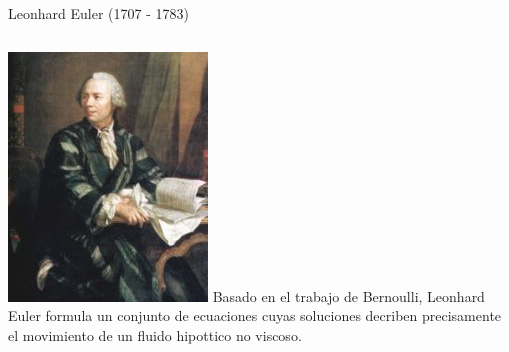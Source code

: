 \documentclass[serif,9pt]{beamer}
\begin{document}
\begin{frame}
\begin{block}{Leonhard Euler (1707 - 1783)}
\begin{columns}
 \hspace{0.9cm}
\includegraphics[width=\textwidth]{Euler} 
Basado en el trabajo de Bernoulli, Leonhard Euler formula un conjunto de ecuaciones cuyas soluciones decriben
precisamente el movimiento de un fluido hipottico no viscoso.
\end{columns}
\end{block}

\end{frame}
\end{document}
